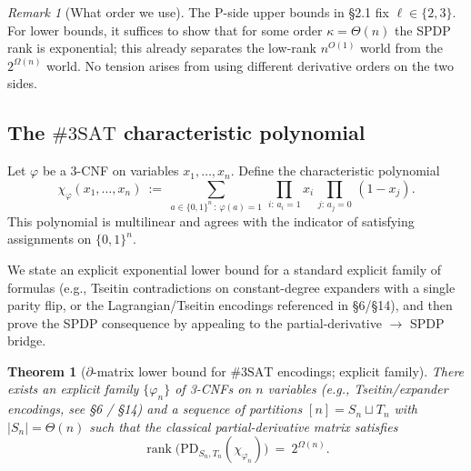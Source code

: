 \documentclass[12pt]{article}
\newtheorem{theorem}{Theorem}
\theoremstyle{definition}
\theoremstyle{definition}
\theoremstyle{remark}
\newtheorem{remark}{Remark}
\theoremstyle{remark}
\begin{document}
\begin{remark}[What order we use]
The P-side upper bounds in \S2.1 fix $\ell\in\{2,3\}$. For lower bounds, it suffices to show that for some order $\kappa=\Theta(n)$ the SPDP rank is exponential; this already separates the low-rank $n^{O(1)}$ world from the $2^{\Omega(n)}$ world. No tension arises from using different derivative orders on the two sides.
\end{remark}

\subsection{The $\#3\mathrm{SAT}$ characteristic polynomial}

Let $\varphi$ be a 3-CNF on variables $x_1,\dots,x_n$. Define the characteristic polynomial
\begin{equation}\label{eq:3sat-char-poly}
\chi_\varphi(x_1,\dots,x_n)\ :=\ \sum_{a\in\{0,1\}^n\,:\,\varphi(a)=1}\,\prod_{i:\,a_i=1} x_i\,\prod_{j:\,a_j=0}\,(1-x_j).
\end{equation}
This polynomial is multilinear and agrees with the indicator of satisfying assignments on $\{0,1\}^n$.

We state an explicit exponential lower bound for a standard explicit family of formulas (e.g., Tseitin contradictions on constant-degree expanders with a single parity flip, or the Lagrangian/Tseitin encodings referenced in \S6/\S14), and then prove the SPDP consequence by appealing to the partial-derivative $\to$ SPDP bridge.

\begin{theorem}[$\partial$-matrix lower bound for $\#3\mathrm{SAT}$ encodings; explicit family]\label{thm:3sat-partial-derivative-lb}
There exists an explicit family $\{\varphi_n\}$ of 3-CNFs on $n$ variables (e.g., Tseitin/expander encodings, see \S6 / \S14) and a sequence of partitions $[n]=S_n\sqcup T_n$ with $|S_n|=\Theta(n)$ such that the classical partial-derivative matrix satisfies
\[
\operatorname{rank}\bigl(\mathrm{PD}_{S_n,T_n}(\chi_{\varphi_n})\bigr)\ =\ 2^{\Omega(n)}.
\]
\end{theorem}
\end{document}

